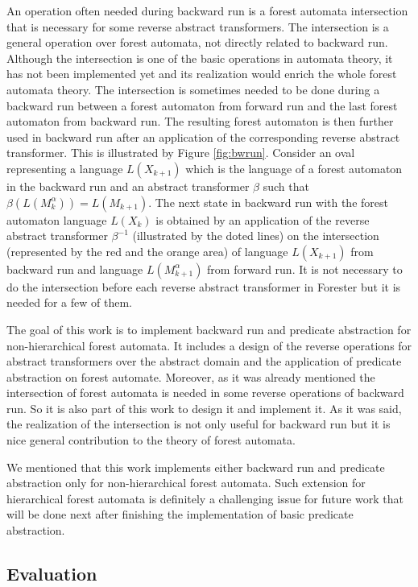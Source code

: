 \documentclass[fleqn,11pt]{ExcelAtFIT} %
\begin{document}
An operation often needed during backward run is a forest automata intersection
that is necessary for some reverse abstract transformers.
The intersection is a general operation over forest automata,
not directly related to backward run.
Although the intersection is one of the basic operations in automata theory,
it has not been implemented yet and its realization would enrich the whole forest automata theory.
The intersection is sometimes needed to be done during a backward run between a forest automaton from forward run
and the last forest automaton from backward run.
The resulting forest automaton is then further used in backward run after an application
of the corresponding reverse abstract transformer.
This is illustrated by Figure \ref{fig:bwrun}.
Consider an oval representing a language $L(X_{k+1})$ which is the language
of a forest automaton in the backward run and an abstract transformer $\beta$ such that $\beta(L(M^{\alpha}_{k})) = L(M_{k+1})$.
The next state in backward run with the forest automaton language $L(X_{k})$ is obtained
by an application of the reverse abstract transformer $\beta^{-1}$ (illustrated by the doted lines) on the intersection
(represented by the red and the orange area) of language $L(X_{k+1})$ from backward run 
and language $L(M^{\alpha}_{k+1})$ from forward run.
It is not necessary to do the intersection before each reverse abstract transformer in Forester
but it is needed for a few of them.

The goal of this work is to implement backward run and predicate abstraction
for non-hierarchical forest automata.
It includes a design of the reverse operations for abstract transformers over
the abstract domain and the application of predicate abstraction on forest automate.
Moreover, as it was already mentioned the intersection of forest automata is needed in some reverse
operations of backward run.
So it is also part of this work to design it and implement it.
As it was said, the realization of the intersection is not only useful for backward run but
it is nice general contribution to the theory of forest automata.

We mentioned that this work implements either backward run and predicate abstraction only for
non-hierarchical forest automata.
Such extension for hierarchical forest automata is definitely a challenging issue for future work
that will be done next after finishing the implementation of basic predicate abstraction.

\subsection{Evaluation}
\end{document}
